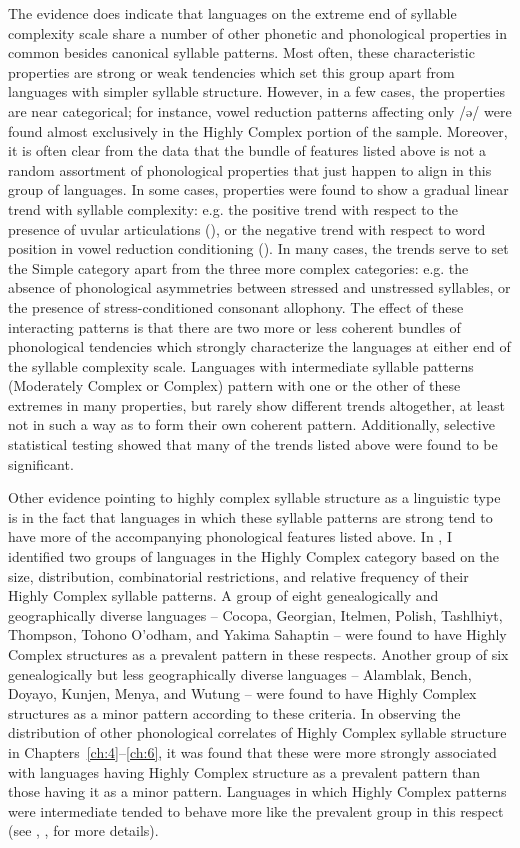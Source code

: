   The evidence does indicate that languages on the extreme end of syllable complexity scale share a number of other phonetic and phonological properties in common besides canonical syllable patterns. Most often, these characteristic properties are strong or weak tendencies which set this group apart from languages with simpler syllable structure. However, in a few cases, the properties are near categorical; for instance, vowel reduction patterns affecting only /ə/ were found almost exclusively in the Highly Complex portion of the sample. Moreover, it is often clear from the data that the bundle of features listed above is not a random assortment of phonological properties that just happen to align in this group of languages. In some cases, properties were found to show a gradual linear trend with syllable complexity: e.g. the positive trend with respect to the presence of uvular articulations (), or the negative trend with respect to word position in vowel reduction conditioning (). In many cases, the trends serve to set the Simple category apart from the three more complex categories: e.g. the absence of phonological asymmetries between stressed and unstressed syllables, or the presence of stress-conditioned consonant allophony. The effect of these interacting patterns is that there are two more or less coherent bundles of phonological tendencies which strongly characterize the languages at either end of the syllable complexity scale. Languages with intermediate syllable patterns (Moderately Complex or Complex) pattern with one or the other of these extremes in many properties, but rarely show different trends altogether, at least not in such a way as to form their own coherent pattern. Additionally, selective statistical testing showed that many of the trends listed above were found to be significant.

  Other evidence pointing to highly complex syllable structure as a linguistic type is in the fact that languages in which these syllable patterns are strong tend to have more of the accompanying phonological features listed above. In , I identified two groups of languages in the Highly Complex category based on the size, distribution, combinatorial restrictions, and relative frequency of their Highly Complex syllable patterns. A group of eight genealogically and geographically diverse languages -- Cocopa, Georgian, Itelmen, Polish, Tashlhiyt, Thompson, Tohono O’odham, and Yakima Sahaptin -- were found to have Highly Complex structures as a prevalent pattern in these respects. Another group of six genealogically but less geographically diverse languages -- Alamblak, Bench, Doyayo, Kunjen, Menya, and Wutung -- were found to have Highly Complex structures as a minor pattern according to these criteria. In observing the distribution of other phonological correlates of Highly Complex syllable structure in Chapters~\ref{ch:4}--\ref{ch:6}, it was found that these were more strongly associated with languages having Highly Complex structure as a prevalent pattern than those having it as a minor pattern. Languages in which Highly Complex patterns were intermediate tended to behave more like the prevalent group in this respect (see , ,  for more details).

